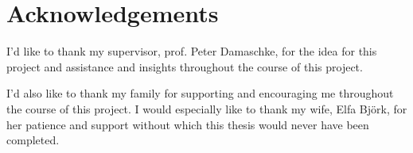 \chapter*{Acknowledgements}
I'd like to thank my supervisor, prof. Peter Damaschke, for the idea for this project and assistance and insights throughout the course of this project.

I'd also like to thank my family for supporting and encouraging me throughout the course of this project. I would especially like to thank my wife, Elfa Björk, for her patience and support without which this thesis would never have been completed.
